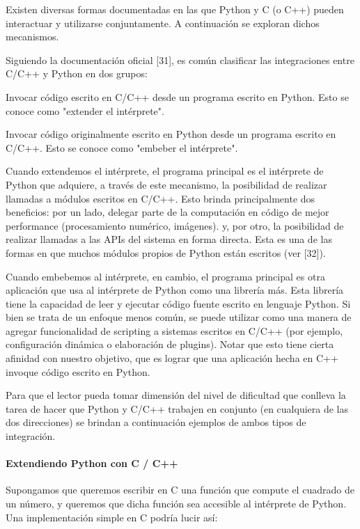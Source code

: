 \documentclass[]{article}
\begin{document}
Existen diversas formas documentadas en las que Python y C (o C++) pueden
interactuar y utilizarse conjuntamente. A continuación se exploran dichos
mecanismos.

Siguiendo la documentación oficial [31], es común clasificar las integraciones
entre C/C++ y Python en dos grupos:


Invocar código escrito en C/C++ desde un programa escrito en Python. Esto se
conoce como "extender el intérprete".

Invocar código originalmente escrito en Python desde un programa escrito en
C/C++. Esto se conoce como "embeber el intérprete".

Cuando extendemos el intérprete, el programa principal es el intérprete de
Python que adquiere, a través de este mecanismo, la posibilidad de realizar
llamadas a módulos escritos en C/C++. Esto brinda principalmente dos
beneficios: por un lado, delegar parte de la computación en código de mejor
performance (procesamiento numérico, imágenes). y, por otro, la posibilidad de
realizar llamadas a las APIs del sistema en forma directa. Esta es una de las
formas en que muchos módulos propios de Python están escritos (ver [32]).

Cuando embebemos al intérprete, en cambio, el programa principal es otra
aplicación que usa al intérprete de Python como una librería más. Esta librería
tiene la capacidad de leer y ejecutar código fuente escrito en lenguaje Python.
Si bien se trata de un enfoque menos común, se puede utilizar como una manera
de agregar funcionalidad de scripting a sistemas escritos en C/C++ (por
ejemplo, configuración dinámica o elaboración de plugins). Notar que esto tiene
cierta afinidad con nuestro objetivo, que es lograr que una aplicación hecha en
C++ invoque código escrito en Python.

Para que el lector pueda tomar dimensión del nivel de dificultad que conlleva
la tarea de hacer que Python y C/C++ trabajen en conjunto (en cualquiera de las
dos direcciones) se brindan a continuación ejemplos de ambos tipos de
integración.

\paragraph{Extendiendo Python con C / C++}

Supongamos que queremos escribir en C una función que compute el cuadrado de un
número, y queremos que dicha función sea accesible al intérprete de Python.
Una implementación simple en C podría lucir así:
\end{document}

